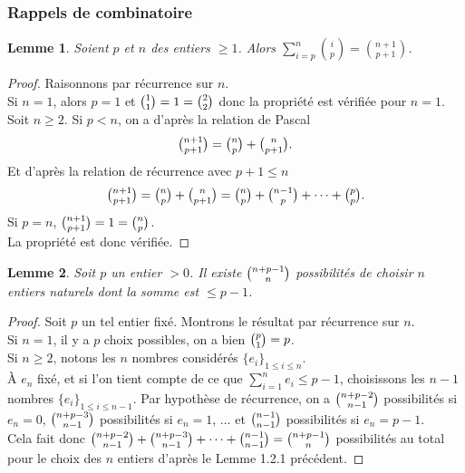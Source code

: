 \documentclass[11pt]{article}
\newtheorem{lemm}{Lemme}[subsection]
\begin{document}
\subsubsection{Rappels de combinatoire}

\begin{lemm}
Soient $p$ et $n$ des entiers $\geqslant 1$. Alors $\sum_{i=p}^n \binom{i}{p} = \binom{n+1}{p+1}$.
\end{lemm}

\begin{small}
\begin{proof}
Raisonnons par récurrence sur $n$.\\
\noindent
Si $n=1$, alors $p=1$ et $\tbinom{1}{1}=1=\tbinom{2}{2}$ donc la propriété est vérifiée pour $n=1$.\\

\noindent
Soit $n \geqslant 2$. Si $p<n$, on a d'après la relation de Pascal
\begin{align*}
\tbinom{n+1}{p+1}=\tbinom{n}{p}+\tbinom{n}{p+1}.
\end{align*}
\noindent
Et d'après la relation de récurrence avec $p+1 \leqslant n$
\begin{align*}
\tbinom{n+1}{p+1}=\tbinom{n}{p}+\tbinom{n}{p+1}=\tbinom{n}{p}+\tbinom{n-1}{p}+ \dots + \tbinom{p}{p}.
\end{align*}
Si $p=n$, $\tbinom{n+1}{p+1}=1=\tbinom{n}{p}$.\\
\noindent
La propriété est donc vérifiée.
\end{proof}
\end{small}

\begin{lemm}
Soit $p$ un entier $>0$. Il existe $\tbinom{n+p-1}{n}$ possibilités de choisir $n$ entiers naturels dont la somme est $\leqslant p-1$.
\end{lemm}

\begin{small}
\begin{proof}
Soit $p$ un tel entier fixé. Montrons le résultat par récurrence sur $n$.\\

\noindent
Si $n=1$, il y a $p$ choix possibles, on a bien $\tbinom{p}{1}=p$.\\

\noindent
Si $n \geqslant 2$, notons les $n$ nombres considérés $\{e_i\}_{1 \leqslant i \leqslant n}$.\\
\noindent
À $e_n$ fixé, et si l'on tient compte de ce que $\sum_{i=1}^n e_i \leqslant p-1$, choisissons les $n-1$ nombres $\{e_i\}_{1 \leqslant i \leqslant n-1}$. Par hypothèse de récurrence, on a $\tbinom{n+p-2}{n-1}$ possibilités si $e_n=0$, $\tbinom{n+p-3}{n-1}$ possibilités si $e_n=1$, $\dots$ et $\tbinom{n-1}{n-1}$ possibilités si $e_n=p-1$.\\

\noindent
Cela fait donc $\tbinom{n+p-2}{n-1}+\tbinom{n+p-3}{n-1}+ \dots + \tbinom{n-1}{n-1}=\tbinom{n+p-1}{n}$ possibilités au total pour le choix des $n$ entiers d'après le Lemme 1.2.1 précédent.
\end{proof}
\end{small}
\end{document}
